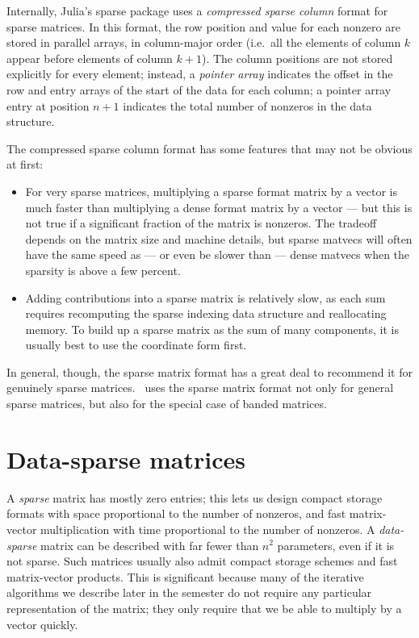 \documentclass[12pt, leqno]{article} %
\begin{document}
Internally, Julia's sparse package uses a {\em compressed sparse
  column} format for sparse matrices.  In this format, the row
position and value for each nonzero are stored in parallel arrays, in
column-major order (i.e.~all the elements of column $k$ appear before
elements of column $k+1$).  The column positions are not stored
explicitly for every element; instead, a {\em pointer array} indicates
the offset in the row and entry arrays of the start of the data for
each column; a pointer array entry at position $n+1$ indicates the
total number of nonzeros in the data structure.

The compressed sparse column format has some features that may not
be obvious at first:
\begin{itemize}
\item
  For very sparse matrices, multiplying a sparse format matrix by a
  vector is much faster than multiplying a dense format matrix by a
  vector --- but this is not true if a significant fraction of the
  matrix is nonzeros.  The tradeoff depends on the matrix size and
  machine details, but sparse matvecs will often have the same speed as ---
  or even be slower than --- dense matvecs when the sparsity is above a
  few percent.
\item
  Adding contributions into a sparse matrix is relatively slow,
  as each sum requires recomputing the sparse indexing data structure
  and reallocating memory.  To build up a sparse matrix as the sum of
  many components, it is usually best to use the coordinate form first.
\end{itemize}
In general, though, the sparse matrix format has a great deal to
recommend it for genuinely sparse matrices.  \matlab\ uses the sparse
matrix format not only for general sparse matrices, but also for the
special case of banded matrices.

\section{Data-sparse matrices}

A {\em sparse} matrix has mostly zero entries; this lets us design
compact storage formats with space proportional to the number of nonzeros,
and fast matrix-vector multiplication with time proportional to the
number of nonzeros.  A {\em data-sparse} matrix can be described with
far fewer than $n^2$ parameters, even if it is not sparse.  Such matrices
usually also admit compact storage schemes and fast matrix-vector products.
This is significant because many of the iterative algorithms we
describe later in the semester do not require any particular representation
of the matrix; they only require that we be able to multiply by a vector
quickly.
\end{document}

